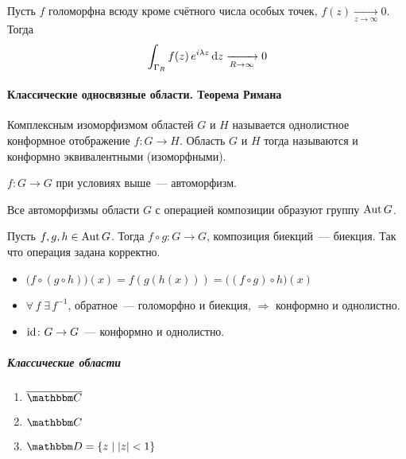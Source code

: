 \documentclass[12pt,timbord]{../../../notes}
\begin{document}
\begin{lem}[Жордана]\label{lem:tfcv::intresidue::jordan}
  Пусть $f$ голоморфна всюду кроме счётного числа особых точек, $f(z) \xrightarrow[z\to \infty]{}  0$.
  Тогда
  \[
    \int_{\Gamma_R} f(z) \, e^{i \lambda z} \, \mathrm{d} z \xrightarrow[R \to \infty]{} 0
  \]
\end{lem}

\setcounter{paragraph}{54}
\paragraph{Классические односвязные области. Теорема Римана}
\label{par:tfcv::riemanaut}

\begin{defn}\label{defn:tfcv::riemanaut::isom}
  Комплексным изоморфизмом областей $G$ и $H$ называется однолистное конформное отображение
  $f \colon G \to H$. Область $G$ и $H$ тогда называются и конформно эквивалентными (изоморфными).
\end{defn}
\begin{rem*}
  $f\colon G \to G$ при условиях выше~--- автоморфизм.
\end{rem*}

\begin{prop}\label{prop:tfcv::riemanaut::autgroup}
  Все автоморфизмы области $G$ с операцией композиции образуют группу $\operatorname{Aut} G$.
\end{prop}
\begin{itlproof}
  Пусть $f, g, h\in \operatorname{Aut} G$. Тогда $f \circ g \colon G \to G$, композиция биекций~--- биекция. Так
  что операция задана корректно.
  \begin{itemize}
    \item $\bigl(f \circ (g\circ h)\bigr)(x) = f(g(h(x))) = \bigl((f \circ g)\circ h\bigr)(x)$
    \item $\forall\, f\; \exists\,f^{-1}$, обратное~--- голоморфно и биекция, $ \Rightarrow $
      конформно и однолистно.
    \item $\operatorname{id}\colon G\to G$~--- конформно и однолистно. 
  \end{itemize}
\end{itlproof}

\subparagraph{Классические области}
\begin{enumerate}
  \item $\overline{\C}$
  \item ${\C}$
  \item $\D = \{z\mid |z| < 1\}$
\end{enumerate}
\end{document}
